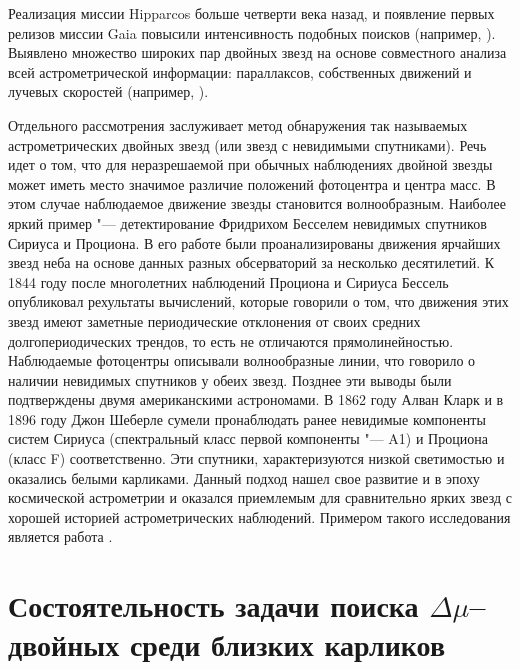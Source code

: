 Реализация миссии Hipparcos больше четверти века назад, и появление первых релизов миссии Gaia повысили интенсивность подобных поисков (например, \cite{2018JDSD...14..367K}). Выявлено множество широких пар двойных звезд на основе совместного анализа всей астрометрической информации: параллаксов, собственных движений и лучевых скоростей (например, \cite{2019A&A...623A..72K}).

Отдельного рассмотрения заслуживает метод обнаружения так называемых астрометрических двойных звезд (или звезд с невидимыми спутниками). Речь идет о том, что для неразрешаемой при обычных наблюдениях двойной звезды может иметь место значимое различие положений фотоцентра и центра масс. В этом случае наблюдаемое движение звезды становится волнообразным. Наиболее яркий пример "--- детектирование Фридрихом Бесселем невидимых спутников Сириуса и Проциона. В его работе были проанализированы движения ярчайших звезд неба на основе данных разных обсерваторий за несколько десятилетий. К 1844 году после многолетних наблюдений Проциона и Сириуса Бессель опубликовал рехультаты вычислений, которые говорили о том, что движения этих звезд имеют заметные периодические отклонения от своих средних долгопериодических трендов, то есть не отличаются прямолинейностью. Наблюдаемые фотоцентры описывали волнообразные линии, что говорило о наличии невидимых спутников у обеих звезд. Позднее эти выводы были подтверждены двумя американскими астрономами. В 1862 году Алван Кларк и в 1896 году Джон Шеберле сумели пронаблюдать ранее невидимые компоненты систем Сириуса (спектральный класс первой компоненты "--- A1) и Проциона (класс F) соответственно. Эти спутники, характеризуются низкой светимостью и оказались белыми карликами. Данный подход нашел свое развитие и в эпоху космической астрометрии и оказался приемлемым для сравнительно ярких звезд с хорошей историей астрометрических наблюдений. Примером такого исследования является работа \cite{2002A&A...391..647G}.

\section{Состоятельность задачи поиска $\Delta\mu$--двойных среди близких карликов}\label{sec:ch1/sectN2}
